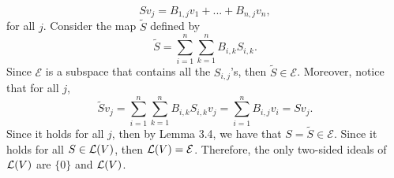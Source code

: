 \begin{solution}
    $$S v_j = B_{1,j}v_1 + ... + B_{n,j}v_n,$$
    for all $j$. Consider the map $\tilde{S}$ defined by
    $$\tilde{S} = \sum_{i=1}^{n}\sum_{k=1}^{n}B_{i,k}S_{i,k}.$$
    Since $\mathcal{E}$ is a subspace that contains all the $S_{i,j}$'s, then $\tilde{S} \in \mathcal{E}$. Moreover, notice that for all $j$,
    $$\tilde{S}v_j = \sum_{i=1}^{n}\sum_{k=1}^{n}B_{i,k}S_{i,k} v_j = \sum_{i=1}^{n}B_{i,j}v_i = Sv_j.$$
    Since it holds for all $j$, then by Lemma 3.4, we have that $S = \tilde{S} \in \mathcal{E}$. Since it holds for all $S \in \mathcal{L}(V)$, then $\mathcal{L}(V) = \mathcal{E}$. Therefore, the only two-sided ideals of $\mathcal{L}(V)$ are $\{0\}$ and $\mathcal{L}(V)$.  \\
\end{solution}

